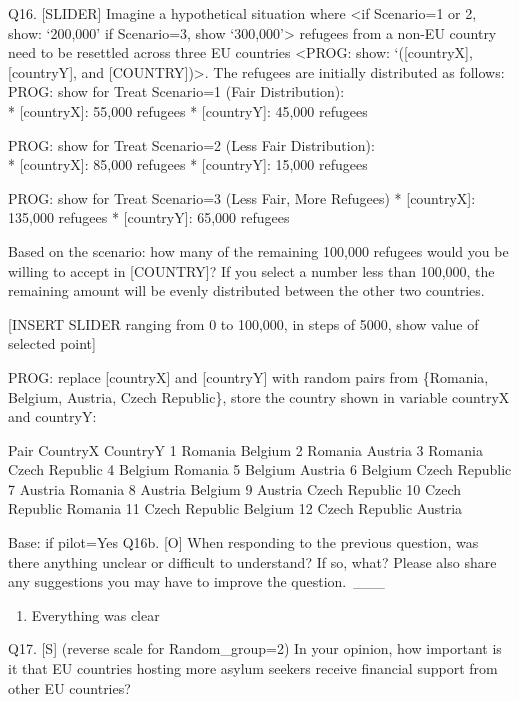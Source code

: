 \documentclass[
  12pt,
  a4paper,
]{article}
\providecommand{\tightlist}{%
  \setlength{\itemsep}{0pt}\setlength{\parskip}{0pt}}
\begin{document}
Q16. {[}SLIDER{]} Imagine a hypothetical situation where \textless if Scenario=1 or 2, show: `200,000' if Scenario=3, show `300,000'\textgreater{} refugees from a non-EU country need to be resettled across three EU countries \textless PROG: show: `({[}countryX{]}, {[}countryY{]}, and {[}COUNTRY{]})\textgreater. The refugees are initially distributed as follows:
PROG: show for Treat Scenario=1 (Fair Distribution):\\
* {[}countryX{]}: 55,000 refugees
* {[}countryY{]}: 45,000 refugees

PROG: show for Treat Scenario=2 (Less Fair Distribution):\\
* {[}countryX{]}: 85,000 refugees
* {[}countryY{]}: 15,000 refugees

PROG: show for Treat Scenario=3 (Less Fair, More Refugees)
* {[}countryX{]}: 135,000 refugees
* {[}countryY{]}: 65,000 refugees

Based on the scenario: how many of the remaining 100,000 refugees would you be willing to accept in {[}COUNTRY{]}? If you select a number less than 100,000, the remaining amount will be evenly distributed between the other two countries.

{[}INSERT SLIDER ranging from 0 to 100,000, in steps of 5000, show value of selected point{]}

PROG: replace {[}countryX{]} and {[}countryY{]} with random pairs from \{Romania, Belgium, Austria, Czech Republic\}, store the country shown in variable countryX and countryY:

Pair CountryX CountryY
1 Romania Belgium
2 Romania Austria
3 Romania Czech Republic
4 Belgium Romania
5 Belgium Austria
6 Belgium Czech Republic
7 Austria Romania
8 Austria Belgium
9 Austria Czech Republic
10 Czech Republic Romania
11 Czech Republic Belgium
12 Czech Republic Austria

Base: if pilot=Yes
Q16b. {[}O{]} When responding to the previous question, was there anything unclear or difficult to understand? If so, what? Please also share any suggestions you may have to improve the question.\,
\_\_\_

\begin{enumerate}
\def\labelenumi{\arabic{enumi}.}
\setcounter{enumi}{97}
\tightlist
\item
  Everything was clear
\end{enumerate}

Q17. {[}S{]} (reverse scale for Random\_group=2) In your opinion, how important is it that EU countries hosting more asylum seekers receive financial support from other EU countries?
\end{document}
